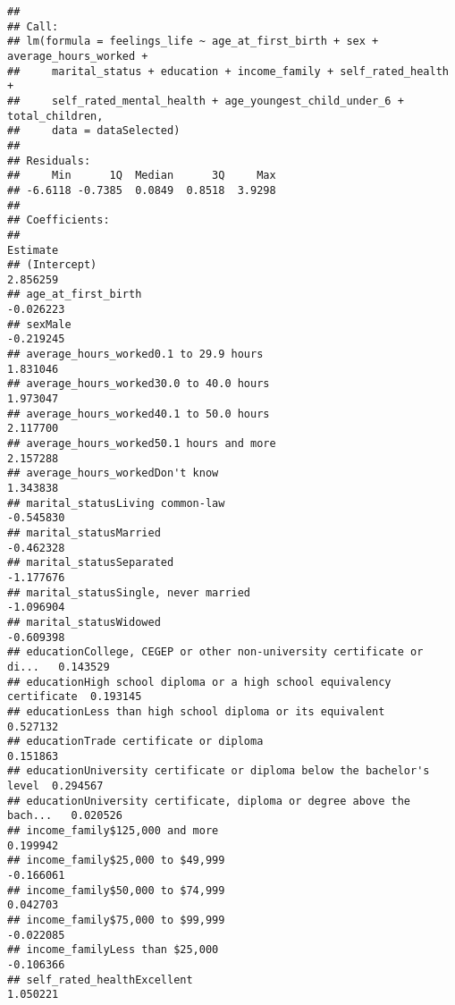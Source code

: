 \documentclass[
]{article}
\begin{document}
\begin{verbatim}
## 
## Call:
## lm(formula = feelings_life ~ age_at_first_birth + sex + average_hours_worked + 
##     marital_status + education + income_family + self_rated_health + 
##     self_rated_mental_health + age_youngest_child_under_6 + total_children, 
##     data = dataSelected)
## 
## Residuals:
##     Min      1Q  Median      3Q     Max 
## -6.6118 -0.7385  0.0849  0.8518  3.9298 
## 
## Coefficients:
##                                                                        Estimate
## (Intercept)                                                            2.856259
## age_at_first_birth                                                    -0.026223
## sexMale                                                               -0.219245
## average_hours_worked0.1 to 29.9 hours                                  1.831046
## average_hours_worked30.0 to 40.0 hours                                 1.973047
## average_hours_worked40.1 to 50.0 hours                                 2.117700
## average_hours_worked50.1 hours and more                                2.157288
## average_hours_workedDon't know                                         1.343838
## marital_statusLiving common-law                                       -0.545830
## marital_statusMarried                                                 -0.462328
## marital_statusSeparated                                               -1.177676
## marital_statusSingle, never married                                   -1.096904
## marital_statusWidowed                                                 -0.609398
## educationCollege, CEGEP or other non-university certificate or di...   0.143529
## educationHigh school diploma or a high school equivalency certificate  0.193145
## educationLess than high school diploma or its equivalent               0.527132
## educationTrade certificate or diploma                                  0.151863
## educationUniversity certificate or diploma below the bachelor's level  0.294567
## educationUniversity certificate, diploma or degree above the bach...   0.020526
## income_family$125,000 and more                                         0.199942
## income_family$25,000 to $49,999                                       -0.166061
## income_family$50,000 to $74,999                                        0.042703
## income_family$75,000 to $99,999                                       -0.022085
## income_familyLess than $25,000                                        -0.106366
## self_rated_healthExcellent                                             1.050221

\end{verbatim}
\end{document}
